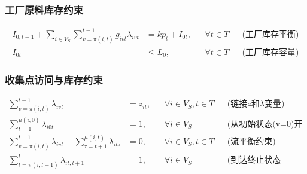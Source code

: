 \documentclass{article}
\begin{document}
\subsubsection{工厂原料库存约束}
\vspace{-1.5ex}
\begin{align}
I_{0,t-1} + \sum_{i \in V_S} \sum_{v=\pi(i,t)}^{t-1} g_{ivt}\lambda_{ivt} &= k p_t + I_{0t}, && \forall t \in T && \text{(工厂库存平衡)} \\
I_{0t} &\leq L_0, && \forall t \in T && \text{(工厂库存容量)}
\end{align}

\subsubsection{收集点访问与库存约束}
\vspace{-1.5ex}
\begin{align}
\sum_{v=\pi(i,t)}^{t-1} \lambda_{ivt} &= z_{it}, && \forall i \in V_S, t \in T && \text{(链接$z$和$\lambda$变量)} \\
\sum_{t=1}^{\mu(i,0)} \lambda_{i0t} &= 1, && \forall i \in V_S && \text{(从初始状态(v=0)开始)} \\
\sum_{v=\pi(i,t)}^{t-1} \lambda_{ivt} - \sum_{\tau=t+1}^{\mu(i,t)} \lambda_{it\tau} &= 0, && \forall i \in V_S, t \in T && \text{(流平衡约束)} \\
\sum_{t=\pi(i,l+1)}^{l} \lambda_{it,l+1} &= 1, && \forall i \in V_S && \text{(到达终止状态(t=l+1))}
\end{align}
\end{document}
